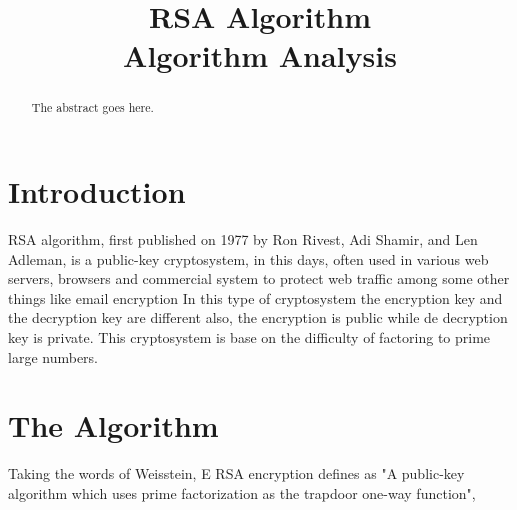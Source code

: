 \documentclass[conference,compsoc, 10pt]{IEEEtran}
\begin{document}
	

\title{RSA Algorithm\\ Algorithm Analysis}
\author{
\and
{}
\and
{}
}

\maketitle
\large
\begin{abstract}
	\large
	The abstract goes here.
\end{abstract}

\IEEEpeerreviewmaketitle

\section{Introduction}
RSA algorithm, first published on 1977 by Ron Rivest, Adi Shamir, and Len Adleman,  is a public-key cryptosystem, in this days, often used in various web servers, browsers and commercial system to protect web traffic among some other things like email encryption In this type of cryptosystem the encryption key and the decryption key are different also, the encryption is public while de decryption key is private. This cryptosystem is base on the difficulty of factoring to prime large numbers.

\section{The Algorithm}
Taking the words of Weisstein, E RSA encryption defines as "A public-key algorithm which uses prime factorization as the trapdoor one-way function", 
\end{document}
